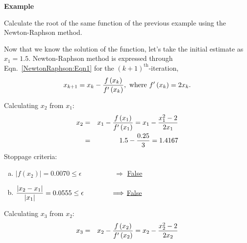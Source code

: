    \begin{MyExample}{\begin{center}{\bf Example}\end{center}}
     \begin{example}\label{Section:RootFinderMethods:Example:Roots:NewtonRaphson} 
         Calculate the root of the same function of the previous example using the Newton-Raphson method.
     \end{example}

        Now that we know the solution of the function, let's take the initial estimate as $x_{1}=1.5$. Newton-Raphson method is expressed through Eqn.~\ref{NewtonRaphson:Eqn1} for the $(k+1)^{\text{th}}$-iteration,
          \begin{displaymath}
            x_{k+1} = x_{k} - \displaystyle\frac{f\left(x_{k}\right)}{f'\left(x_{k}\right)}, \text{ where } f'\left(x_{k}\right) = 2x_{k}.
         \end{displaymath}
         \begin{list}{{\bf Iteration } (k=):~}{}
            \item Calculating $x_{2}$ from $x_{1}$:
                  \begin{eqnarray}
                      x_{2} &=& x_{1} - \displaystyle\frac{f\left(x_{1}\right)}{f'\left(x_{1}\right)} = x_{1} - \displaystyle\frac{ x_{1}^{2}-2 }{ 2x_{1}}   \nonumber \\
                           &=& 1.5 - \displaystyle\frac{0.25}{3} = 1.4167\nonumber
                  \end{eqnarray}
                  Stoppage criteria:
                    \begin{enumerate}[(a)]
                         \item $\left|f\left(x_{2}\right)\right| = 0.0070 \leq \epsilon \hspace{2cm} \Longrightarrow$ \underline{False}
                         \item $\displaystyle\frac{\left|x_{2}-x_{1}\right|}{\left|x_{1}\right|} = 0.0555 \leq \epsilon \hspace{1.4cm} \Longrightarrow$ \underline{False}
                    \end{enumerate}
            \item Calculating $x_{3}$ from $x_{2}$:
                  \begin{eqnarray}
                      x_{3} &=& x_{2} - \frc{f\left(x_{2}\right)}{f'\left(x_{2}\right)} = x_{2} - \frc{ x_{2}^{2}-2 }{ 2x_{2}}  \nonumber \\

\end{eqnarray}
\end{list}
\end{MyExample}
